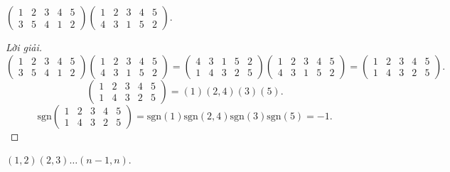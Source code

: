 \documentclass[class=nhvh-linear-algebra,crop=false]{standalone}
\newcommand{\sgn}[1]{\text{sgn}\left({#1}\right)}
\begin{document}
\begin{exercise}
    $
        \begin{pmatrix}
            1 & 2 & 3 & 4 & 5 \\
            3 & 5 & 4 & 1 & 2
        \end{pmatrix}
        \begin{pmatrix}
            1 & 2 & 3 & 4 & 5 \\
            4 & 3 & 1 & 5 & 2
        \end{pmatrix}
    $.
\end{exercise}

\begin{proof}[Lời giải]
    \[
        \begin{pmatrix}
            1 & 2 & 3 & 4 & 5 \\
            3 & 5 & 4 & 1 & 2
        \end{pmatrix}
        \begin{pmatrix}
            1 & 2 & 3 & 4 & 5 \\
            4 & 3 & 1 & 5 & 2
        \end{pmatrix}
        =
        \begin{pmatrix}
            4 & 3 & 1 & 5 & 2 \\
            1 & 4 & 3 & 2 & 5
        \end{pmatrix}
        \begin{pmatrix}
            1 & 2 & 3 & 4 & 5 \\
            4 & 3 & 1 & 5 & 2
        \end{pmatrix}
        =
        \begin{pmatrix}
            1 & 2 & 3 & 4 & 5 \\
            1 & 4 & 3 & 2 & 5
        \end{pmatrix}.
    \]
    \[
        \begin{pmatrix}
            1 & 2 & 3 & 4 & 5 \\
            1 & 4 & 3 & 2 & 5
        \end{pmatrix}
        =
        (1)(2,4)(3)(5).
    \]
    \[
        \sgn{
            \begin{matrix}
                1 & 2 & 3 & 4 & 5 \\
                1 & 4 & 3 & 2 & 5
            \end{matrix}
        }
        = \sgn{1}\sgn{2,4}\sgn{3}\sgn{5}
        = -1.
    \]
\end{proof}

\begin{exercise}
    $(1,2)(2,3)\ldots (n-1,n)$.
\end{exercise}
\end{document}

